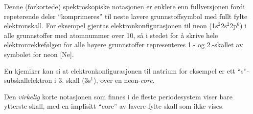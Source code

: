 












Denne (forkortede) spektroskopiske notasjonen er enklere enn fullversjonen fordi repeterende deler ``komprimeres'' til neste lavere grunnstoffsymbol med fullt fylte elektronskall. For eksempel gjentas elektronkonfigurasjonen til neon (1s$^{2}$2s$^{2}$2p$^{6}$) i alle grunnstoffer med atomnummer over 10, så i stedet for å skrive hele elektronrekkefølgen for alle høyere grunnstoffer representeres 1.- og 2.-skallet av symbolet for neon [Ne].

\vskip 10pt

En kjemiker kan si at elektronkonfigurasjonen til natrium for eksempel er ett ``s''-subskallelektron i 3. skall (3s$^{1}$), over en neon-{\it core}.

Den {\it virkelig} korte notasjonen som finnes i de fleste periodesystem viser bare ytterste skall, med en implisitt ``core'' av lavere fylte skall som ikke vises.



